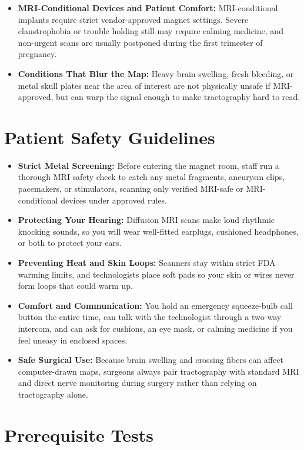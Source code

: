 \begin{itemize}
    \item \textbf{MRI-Conditional Devices and Patient Comfort:} MRI-conditional implants require strict vendor-approved magnet settings. Severe claustrophobia or trouble holding still may require calming medicine, and non-urgent scans are usually postponed during the first trimester of pregnancy.
    \item \textbf{Conditions That Blur the Map:} Heavy brain swelling, fresh bleeding, or metal skull plates near the area of interest are not physically unsafe if MRI-approved, but can warp the signal enough to make tractography hard to read.
\end{itemize}

\section{Patient Safety Guidelines}

\begin{itemize}
    \item \textbf{Strict Metal Screening:} Before entering the magnet room, staff run a thorough MRI safety check to catch any metal fragments, aneurysm clips, pacemakers, or stimulators, scanning only verified MRI-safe or MRI-conditional devices under approved rules.
    \item \textbf{Protecting Your Hearing:} Diffusion MRI scans make loud rhythmic knocking sounds, so you will wear well-fitted earplugs, cushioned headphones, or both to protect your ears.
    \item \textbf{Preventing Heat and Skin Loops:} Scanners stay within strict FDA warming limits, and technologists place soft pads so your skin or wires never form loops that could warm up.
    \item \textbf{Comfort and Communication:} You hold an emergency squeeze-bulb call button the entire time, can talk with the technologist through a two-way intercom, and can ask for cushions, an eye mask, or calming medicine if you feel uneasy in enclosed spaces.
    \item \textbf{Safe Surgical Use:} Because brain swelling and crossing fibers can affect computer-drawn maps, surgeons always pair tractography with standard MRI and direct nerve monitoring during surgery rather than relying on tractography alone.
\end{itemize}

\section{Prerequisite Tests}

